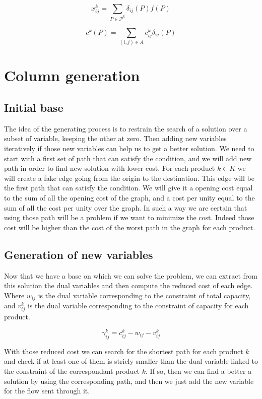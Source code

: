 $$x^k_{ij} = \sum\limits_{P \in \mathcal{P}^k} \delta_{ij} (P) f(P)$$

$$c^k (P) = \sum\limits_{(i,j) \in A} c^k_{ij} \delta_{ij} (P)$$


\section{Column generation}

\subsection{Initial base}

The idea of the generating process is to restrain the search of a solution over a subset of variable, keeping the other at zero. Then adding new variables iteratively if those new variables can help us to get a better solution. We need to start with a first set of path that can satisfy the condition, and we will add new path in order to find new solution with lower cost. For each product $k \in K$ we will create a fake edge going from the origin to the destination. This edge will be the first path that can satisfy the condition. We will give it a opening cost equal to the sum of all the opening cost of the graph, and a cost per unity equal to the sum of all the cost per unity over the graph. In such a way we are certain that using those path will be a problem if we want to minimize the cost. Indeed those cost will be higher than the cost of the worst path in the graph for each product.

\subsection{Generation of new variables}

Now that we have a base on which we can solve the problem, we can extract from this solution the dual variables and then compute the reduced cost of each edge. Where $w_{ij}$ is the dual variable corresponding to the constraint of total capacity, and $v^k_{ij}$ is the dual variable corresponding to the constraint of capacity for each product.

$$\gamma^k_{ij}=c^k_{ij}-w_{ij}-v^k_{ij}$$

With those reduced cost we can search for the shortest path for each product $k$ and check if at least one of them is stricly smaller than the dual variable linked to the constraint of the correspondant product $k$. If so, then we can find a better a solution by using the corresponding path, and then we just add the new variable for the flow sent through it.

